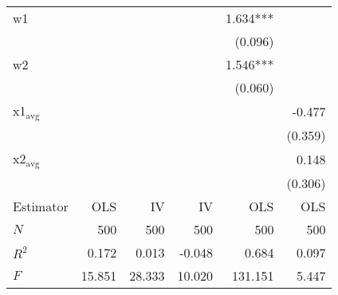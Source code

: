 \begin{tabular}{lrrrrr}
w1                &           &           &           & 1.634*** &                    \\ 
                  &           &           &           &  (0.096) &                    \\ 
w2                &           &           &           & 1.546*** &                    \\ 
                  &           &           &           &  (0.060) &                    \\ 
x1$_{\text{avg}}$ &           &           &           &          &             -0.477 \\ 
                  &           &           &           &          &            (0.359) \\ 
x2$_{\text{avg}}$ &           &           &           &          &              0.148 \\ 
                  &           &           &           &          &            (0.306) \\ 
\midrule
Estimator         &       OLS &        IV &        IV &      OLS &                OLS \\ 
\midrule
$N$               &       500 &       500 &       500 &      500 &                500 \\ 
$R^2$             &     0.172 &     0.013 &    -0.048 &    0.684 &              0.097 \\ 
$F$               &    15.851 &    28.333 &    10.020 &  131.151 &              5.447 \\ 
\bottomrule
\end{tabular}
